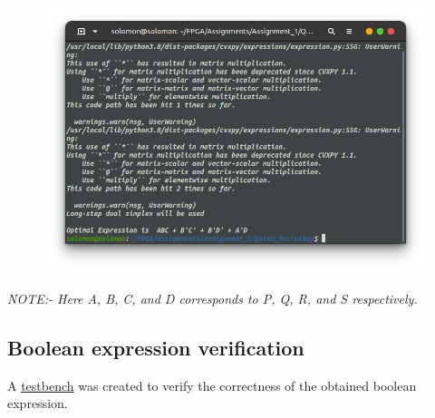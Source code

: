 \documentclass{article}
\begin{document}
\begin{figure}[h!]
\includegraphics[scale=0.5]{./figs/opt.png}
\end{figure}

\textit{NOTE:- Here A, B, C, and D corresponds to P, Q, R, and S respectively.}
    
\subsection*{Boolean expression verification}
A \href{https://github.com/TUdayKiranReddy/FPGA_Lab/tree/main/Assignments/Assignment_1/codes/verification_testbench.c}{testbench} was created to verify the correctness of the obtained boolean expression.
\end{document}
